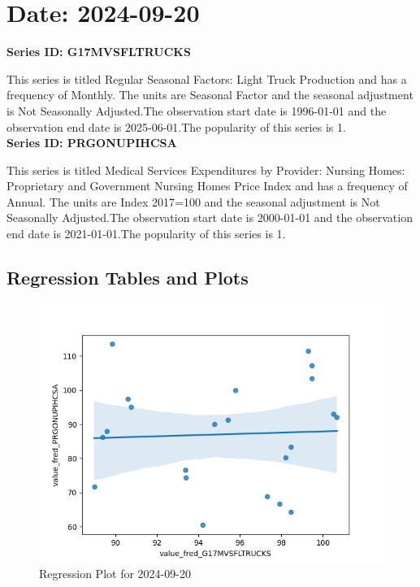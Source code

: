 \section{Date: 2024-09-20}
\noindent \textbf{Series ID: G17MVSFLTRUCKS} 

\noindent This series is titled Regular Seasonal Factors: Light Truck Production and has a frequency of Monthly. The units are Seasonal Factor and the seasonal adjustment is Not Seasonally Adjusted.The observation start date is 1996-01-01 and the observation end date is 2025-06-01.The popularity of this series is 1. \\ 

\noindent \textbf{Series ID: PRGONUPIHCSA} 

\noindent This series is titled Medical Services Expenditures by Provider: Nursing Homes: Proprietary and Government Nursing Homes Price Index and has a frequency of Annual. The units are Index 2017=100 and the seasonal adjustment is Not Seasonally Adjusted.The observation start date is 2000-01-01 and the observation end date is 2021-01-01.The popularity of this series is 1. \\ 

\subsection{Regression Tables and Plots}


\begin{figure}
\centering
\includegraphics[scale = 0.9]{plots/plot_2024-09-20.png}
\caption{Regression Plot for 2024-09-20}
\end{figure}
\newpage
